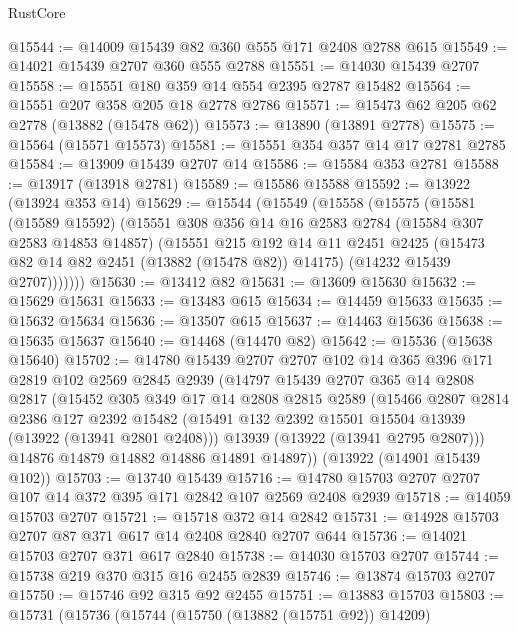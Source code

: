\begin{lexlean}{RustCore}
\begin{coremodule}
@15544 := @14009 @15439 @82 @360 @555 @171 @2408 @2788 @615
@15549 := @14021 @15439 @2707 @360 @555 @2788
@15551 := @14030 @15439 @2707
@15558 := @15551 @180 @359 @14 @554 @2395 @2787 @15482
@15564 := @15551 @207 @358 @205 @18 @2778 @2786
@15571 := @15473 @62 @205 @62 @2778 (@13882 (@15478 @62))
@15573 := @13890 (@13891 @2778)
@15575 := @15564 (@15571 @15573)
@15581 := @15551 @354 @357 @14 @17 @2781 @2785
@15584 := @13909 @15439 @2707 @14
@15586 := @15584 @353 @2781
@15588 := @13917 (@13918 @2781)
@15589 := @15586 @15588
@15592 := @13922 (@13924 @353 @14)
@15629 := @15544
    (@15549
      (@15558
        (@15575
          (@15581
            (@15589 @15592)
            (@15551
              @308
              @356
              @14
              @16
              @2583
              @2784
              (@15584 @307 @2583 @14853 @14857)
              (@15551
                @215
                @192
                @14
                @11
                @2451
                @2425
                (@15473 @82 @14 @82 @2451 (@13882 (@15478 @82)) @14175)
                (@14232 @15439 @2707)))))))
@15630 := @13412 @82
@15631 := @13609 @15630
@15632 := @15629 @15631
@15633 := @13483 @615
@15634 := @14459 @15633
@15635 := @15632 @15634
@15636 := @13507 @615
@15637 := @14463 @15636
@15638 := @15635 @15637
@15640 := @14468 (@14470 @82)
@15642 := @15536 (@15638 @15640)
@15702 := @14780
    @15439
    @2707
    @2707
    @102
    @14
    @365
    @396
    @171
    @2819
    @102
    @2569
    @2845
    @2939
    (@14797
      @15439
      @2707
      @365
      @14
      @2808
      @2817
      (@15452
        @305
        @349
        @17
        @14
        @2808
        @2815
        @2589
        (@15466
          @2807
          @2814
          @2386
          @127
          @2392
          @15482
          (@15491 @132 @2392 @15501 @15504 @13939 (@13922 (@13941 @2801 @2408)))
          @13939
          (@13922 (@13941 @2795 @2807)))
        @14876
        @14879
        @14882
        @14886
        @14891
        @14897))
    (@13922 (@14901 @15439 @102))
@15703 := @13740 @15439
@15716 := @14780 @15703 @2707 @2707 @107 @14 @372 @395 @171 @2842 @107 @2569 @2408 @2939
@15718 := @14059 @15703 @2707
@15721 := @15718 @372 @14 @2842
@15731 := @14928 @15703 @2707 @87 @371 @617 @14 @2408 @2840 @2707 @644
@15736 := @14021 @15703 @2707 @371 @617 @2840
@15738 := @14030 @15703 @2707
@15744 := @15738 @219 @370 @315 @16 @2455 @2839
@15746 := @13874 @15703 @2707
@15750 := @15746 @92 @315 @92 @2455
@15751 := @13883 @15703
@15803 := @15731
    (@15736
      (@15744
        (@15750 (@13882 (@15751 @92)) @14209)

\end{coremodule}
\end{lexlean}
